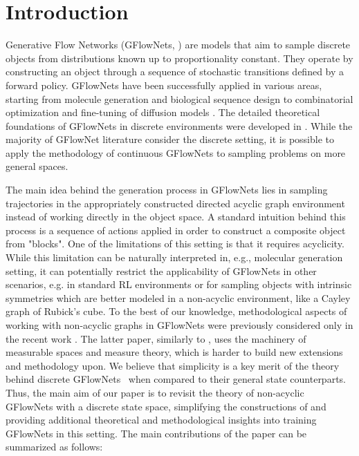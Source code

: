 \section{Introduction}
\label{sec:intro}
Generative Flow Networks (GFlowNets, \citealp{bengio2021flow}) are models that aim to sample discrete objects from distributions known up to proportionality constant. They operate by constructing an object through a sequence of stochastic transitions defined
by a forward policy. GFlowNets have been successfully applied in various areas, starting from molecule generation \cite{bengio2021flow} and biological sequence design \cite{jain2022biological} to combinatorial optimization \cite{zhang2023solving} and fine-tuning of diffusion models \cite{uehara2024understanding}. The detailed theoretical foundations of GFlowNets in discrete environments were developed in \cite{bengio2023gflownet}. While the majority of GFlowNet literature consider the discrete setting, it is possible to apply the methodology of continuous GFlowNets \cite{lahlou2023theory} to sampling problems on more general spaces. 
\par 
The main idea behind the generation process in GFlowNets lies in sampling trajectories in the appropriately constructed directed acyclic graph environment instead of working directly in the object space. A standard intuition behind this process is a sequence of actions applied in order to construct a composite object from "blocks". One of the limitations of this setting is that it requires acyclicity. While this limitation can be naturally interpreted in, e.g., molecular generation setting, it can potentially restrict the applicability of GFlowNets in other scenarios, e.g. in standard RL environments or for sampling objects with intrinsic symmetries which are better modeled in a non-acyclic environment, like a Cayley graph of Rubick’s cube. To the best of our knowledge, methodological aspects of working with non-acyclic graphs in GFlowNets were previously considered only in the recent work  \cite{brunswic2024theory}. The latter paper, similarly to \cite{lahlou2023theory}, uses the machinery of measurable spaces and measure theory, which is harder to build new extensions and methodology upon. We believe that simplicity is a key merit of the theory behind discrete GFlowNets~\cite{bengio2023gflownet} when compared to their general state counterparts. Thus, the main aim of our paper is to revisit the theory of non-acyclic GFlowNets with a discrete state space, simplifying the constructions of \cite{brunswic2024theory} and providing additional theoretical and methodological insights into training GFlowNets in this setting. The main contributions of the paper can be summarized as follows:
